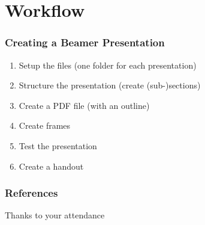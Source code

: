\documentclass[x11names,aspectratio=32]{beamer}
\begin{document}
\section{Workflow}
\begin{frame}
    \frametitle{Creating a Beamer Presentation}
    \begin{enumerate}
        \item Setup the files (one folder for each presentation)
        \item Structure the presentation (create (sub-)sections)
        \item Create a PDF file (with an outline)
        \item Create frames
        \item Test the presentation
        \item Create a handout
    \end{enumerate}

\end{frame}


\begin{frame}
    \frametitle{References}
    \small
    \printbibliography


\end{frame}


\begin{frame}[focus]
    Thanks to your attendance
\end{frame}
\end{document}
